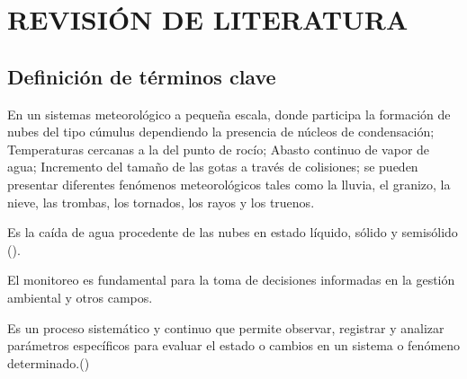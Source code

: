 \chapter{REVISIÓN DE LITERATURA}





\section{Definición de términos clave}
En un sistemas meteorológico a pequeña escala, donde participa la formación de nubes del tipo cúmulus dependiendo la presencia de núcleos de condensación; Temperaturas cercanas a la del punto de rocío; Abasto continuo de vapor de agua; Incremento del tamaño de las gotas a través de colisiones; se pueden presentar diferentes fenómenos meteorológicos tales como la lluvia, el granizo, la nieve, las trombas, los tornados, los rayos y los truenos.
\begin{definition}[Precipitación]
  Es la caída de agua procedente de las nubes en estado líquido, sólido y semisólido (\cite{breña2013}).
\end{definition}


El monitoreo es fundamental para la toma de decisiones informadas en la gestión ambiental y otros campos.
\begin{definition}[Monitoreo]
  Es un proceso sistemático y continuo que permite observar, registrar y analizar parámetros específicos para evaluar el estado o cambios en un sistema o fenómeno determinado.(\cite{ciga_monitoreo})
\end{definition}


